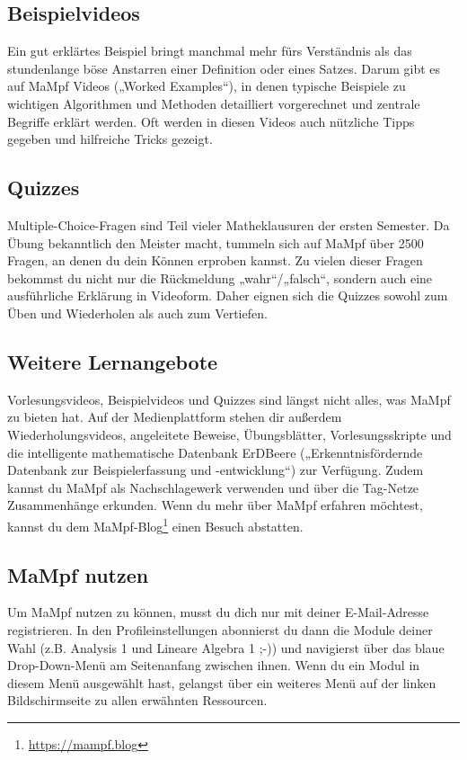\subsection{Beispielvideos}
Ein gut erklärtes Beispiel bringt manchmal mehr fürs Verständnis als das stundenlange böse Anstarren einer Definition oder eines Satzes. Darum gibt es auf MaMpf Videos („Worked Examples“), in denen typische Beispiele zu wichtigen Algorithmen und Methoden detailliert vorgerechnet und zentrale Begriffe erklärt werden. Oft werden in diesen Videos auch nützliche Tipps gegeben und hilfreiche Tricks gezeigt.

\subsection{Quizzes}
Multiple-Choice-Fragen sind Teil vieler Matheklausuren der ersten Semester. Da Übung bekanntlich den Meister macht, tummeln sich auf MaMpf über 2500 Fragen, an denen du dein Können erproben kannst. Zu vielen dieser Fragen bekommst du nicht nur die Rückmeldung „wahr“/„falsch“, sondern auch eine ausführliche Erklärung in Videoform. Daher eignen sich die Quizzes sowohl zum Üben und Wiederholen als auch zum Vertiefen.

\subsection{Weitere Lernangebote}
Vorlesungsvideos, Beispielvideos und Quizzes sind längst nicht alles, was MaMpf zu bieten hat.
Auf der Medienplattform stehen dir außerdem Wiederholungsvideos, angeleitete Beweise, Übungsblätter, Vorlesungsskripte und die intelligente mathematische Datenbank ErDBeere („Erkenntnisfördernde Datenbank zur Beispielerfassung und -entwicklung“) zur Verfügung. Zudem kannst du MaMpf als Nachschlagewerk verwenden und über die Tag-Netze Zusammenhänge erkunden. Wenn du mehr über MaMpf erfahren möchtest, kannst du dem MaMpf-Blog\footnote{\url{https://mampf.blog}} einen Besuch abstatten.  

\subsection{MaMpf nutzen}
Um MaMpf nutzen zu können, musst du dich nur mit deiner E-Mail-Adresse registrieren. In den Profileinstellungen abonnierst du dann die Module deiner Wahl (z.B. Analysis 1 und Lineare Algebra 1 ;-)) und navigierst über das blaue Drop-Down-Menü am Seitenanfang zwischen ihnen. Wenn du ein Modul in diesem Menü ausgewählt hast, gelangst über ein weiteres Menü auf der linken Bildschirmseite zu allen erwähnten Ressourcen.
